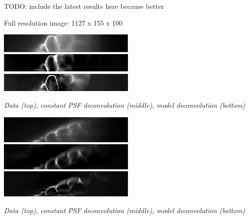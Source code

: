 \documentclass[a0paper,portrait,fontscale=0.35]{baposter}
\newcommand{\mycaption}[1]{
  {
    \smaller
    \emph{#1}
  }
}
\theoremstyle{plain}
\theoremstyle{plain}
\theoremstyle{definition}
\theoremstyle{plain}
\theoremstyle{definition}
\begin{document}
\begin{poster}
{\begin{minipage}[t]{0.48\textwidth}
    TODO: include the latest results here because better

    Full resolution image: 1127 x 155 x 100

    \begin{minipage}[t]{\textwidth}
      \centering
      \includegraphics[width=0.5\textwidth]{img/f_xy1.png}
      \includegraphics[width=0.5\textwidth]{img/urec_h_xy1.png}
      \includegraphics[width=0.5\textwidth]{img/urec_xy1.png}
    \end{minipage}

    \begin{center}
      \mycaption{
        Data (top), constant PSF deconvolution (middle),
        model deconvolution (bottom)
      }
    \end{center}

    \begin{minipage}[t]{\textwidth}
      \centering
      \includegraphics[width=0.5\textwidth]{img/f_xz1.png}
      \includegraphics[width=0.5\textwidth]{img/urec_h_xz1.png}
      \includegraphics[width=0.5\textwidth]{img/urec_xz1.png}
    \end{minipage}

    \begin{center}
      \mycaption{
        Data (top), constant PSF deconvolution (middle),
        model deconvolution (bottom)
      }
    \end{center}




\end{minipage}}
\end{poster}
\end{document}
